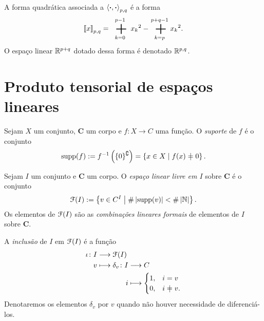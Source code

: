 A forma quadrática associada a $\left\langle{\bm{\cdot}},{\bm{\cdot}}\right\rangle_{p,q}$ é a forma
	\begin{equation*}
	\qua{x}_{p,q} = \sum_{k=0}^{p-1}{x_k}^2 - \sum_{k=p}^{p+q-1}{x_k}^2.
	\end{equation*}
O espaço linear $\mathbb{R}^{p+q}$ dotado dessa forma é denotado $\mathbb{R}^{p,q}$.





\cleardoublepage





\section{Produto tensorial de espaços lineares}

\begin{definition}
Sejam $X$ um conjunto, $\bm C$ um corpo e $f: X \to C$ uma função. O \emph{suporte} de $f$ é o conjunto
	\begin{equation*}
	\supp(f) := f\inv\left(\{0\}^\complement\right) = \set{x \in X}{f(x) \neq 0}.
	\end{equation*}
\end{definition}


\begin{definition} Sejam $I$ um conjunto e $\bm C$ um corpo. O \emph{espaço linear livre em $I$} sobre $\bm C$ é o conjunto
	\begin{equation*}
	\mathcal{F}(I) := \left\{{v \in C^I}\;\middle\vert\;{\#\left\lvert{\operatorname{supp}(v)}\right\rvert<\#\left\lvert{\mathbb{N}}\right\rvert}\right\}.
	\end{equation*}
Os elementos de $\mathcal{F}(I)$ são as \emph{combinações lineares formais} de elementos de $I$ sobre $\bm C$.

A \emph{inclusão} de $I$ em $\mathcal{F}(I)$ é a função
	\begin{align*}
	\func{\iota}{I}{\liv(I)}{v}{
		\begin{aligned}[t]
		\func{\delta_v}{I}{C}{i}{\begin{cases}
							1,& i = v \\
							0,& i \neq v.
						\end{cases}}
		\end{aligned}
	}
	\end{align*}
Denotaremos os elementos $\delta_v$ por $v$ quando não houver necessidade de diferenciá-los.
\end{definition}

